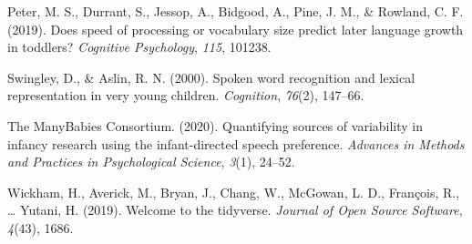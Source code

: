 \documentclass[10pt, letterpaper]{article}
\begin{document}
\leavevmode\hypertarget{ref-peter2019}{}%
Peter, M. S., Durrant, S., Jessop, A., Bidgood, A., Pine, J. M., \&
Rowland, C. F. (2019). Does speed of processing or vocabulary size
predict later language growth in toddlers? \emph{Cognitive Psychology},
\emph{115}, 101238.

\leavevmode\hypertarget{ref-Swingley2000}{}%
Swingley, D., \& Aslin, R. N. (2000). Spoken word recognition and
lexical representation in very young children. \emph{Cognition},
\emph{76}(2), 147--66.

\leavevmode\hypertarget{ref-TheManyBabiesConsortium2020}{}%
The ManyBabies Consortium. (2020). Quantifying sources of variability in
infancy research using the infant-directed speech preference.
\emph{Advances in Methods and Practices in Psychological Science},
\emph{3}(1), 24--52.

\leavevmode\hypertarget{ref-Wickham2019}{}%
Wickham, H., Averick, M., Bryan, J., Chang, W., McGowan, L. D.,
François, R., \ldots{} Yutani, H. (2019). Welcome to the tidyverse.
\emph{Journal of Open Source Software}, \emph{4}(43), 1686.


\end{document}
